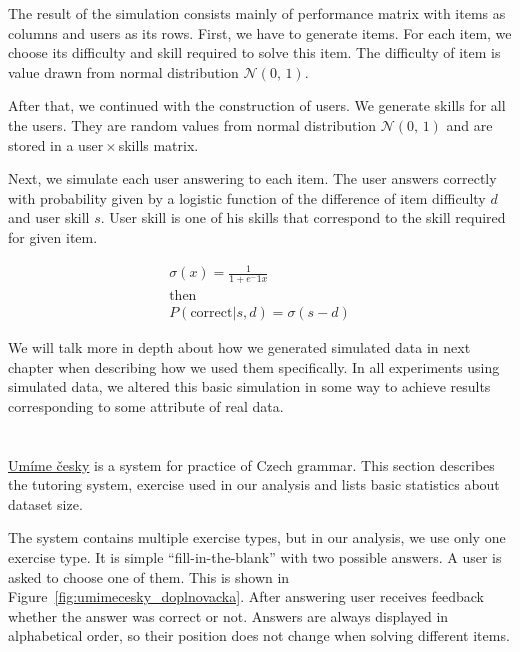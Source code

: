 \documentclass[
  printed, %
  table,   %
  nolof,     %
  nolot,     %
  color,
  final,
  nocover
]{fithesis3}
\begin{document}
The result of the simulation consists mainly of performance matrix with items as columns and users as its rows. First, we have to generate items. For each item, we choose its difficulty and skill required to solve this item. The difficulty of item is value drawn from normal distribution $\mathcal{N}(0,\,1)$.

After that, we continued with the construction of users. We generate skills for all the users. They are random values from normal distribution $\mathcal{N}(0,\,1)$ and are stored in a user\,$\times$\,skills matrix.

Next, we simulate each user answering to each item. The user answers correctly with probability given by a logistic function of the difference of item difficulty $d$ and user skill $s$. User skill is one of his skills that correspond to the skill required for given item.

\begin{gather*}
\sigma(x) = \frac{1}{1 + e^-1x} \\
\text{then}\\
P(\text{correct}|s, d) = \sigma(s - d)
\end{gather*}

We will talk more in depth about how we generated simulated data in next chapter when describing how we used them specifically. In all experiments using simulated data, we altered this basic simulation in some way to achieve results corresponding to some attribute of real data.


\section{\umimeCesky{}}\label{umime-cesky}


\href{https://umimecesky.cz/}{Umíme česky} is a system for practice of Czech grammar. This section describes the tutoring system, exercise used in our analysis and lists basic statistics about dataset size.

The system contains multiple exercise types, but in our analysis, we use only one exercise type. It is simple ``fill-in-the-blank'' with two possible answers. A user is asked to choose one of them. This is shown in Figure~\ref{fig:umimecesky_doplnovacka}. After answering user receives feedback whether the answer was correct or not. Answers are always displayed in alphabetical order, so their position does not change when solving different items.
\end{document}
